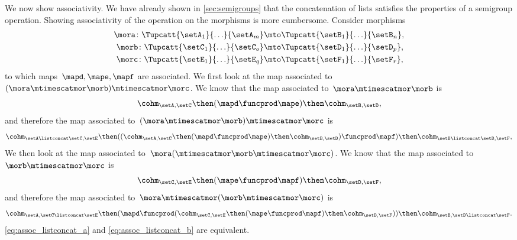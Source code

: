 {\begin{example}
        We now show associativity.
        We have already shown in \cref{sec:semigroups} that the concatenation of lists satisfies the properties of a semigroup operation.
        Showing associativity of the operation on the morphisms is more cumbersome.
        Consider morphisms
        \begin{equation*}
            \begin{aligned}
                \mora\colon \Tupcatt{\setA_1}{\ldots}{\setA_m} & \mto \Tupcatt{\setB_1}{\ldots}{\setB_n}, \\
                \morb\colon \Tupcatt{\setC_1}{\ldots}{\setC_o} & \mto \Tupcatt{\setD_1}{\ldots}{\setD_p}, \\
                \morc\colon \Tupcatt{\setE_1}{\ldots}{\setE_q} & \mto \Tupcatt{\setF_1}{\ldots}{\setF_r},
            \end{aligned}
        \end{equation*}
        to which maps~$\mapd,\mape,\mapf$ are associated.
        We first look at the map associated to~$(\mora \mtimescatmor \morb)\mtimescatmor \morc$.
        We know that the map associated to~$\mora \mtimescatmor \morb$ is
        \begin{equation*}
            \cohm_{\setA,\setC}\then (\mapd\funcprod \mape) \then \cohm_{\setB,\setD},
        \end{equation*}
        and therefore the map associated to~$(\mora \mtimescatmor \morb)\mtimescatmor \morc$ is
        \begin{equation*}
            \cohm_{\setA\listconcat\setC, \setE}\then ((\cohm_{\setA,\setC}\then (\mapd\funcprod \mape) \then \cohm_{\setB,\setD})\funcprod \mapf) \then \cohm_{\setB\listconcat \setD, \setF},
        \end{equation*}
        We then look at the map associated to~$\mora (\mtimescatmor \morb\mtimescatmor \morc)$.
        We know that the map associated to~$\morb \mtimescatmor \morc$ is
        \begin{equation}
            \label{eq:assoc_listconcat_a}
            \cohm_{\setC,\setE}\then (\mape\funcprod \mapf) \then \cohm_{\setD,\setF},
        \end{equation}
        and therefore the map associated to~$\mora \mtimescatmor (\morb\mtimescatmor \morc)$ is
        \begin{equation}
            \label{eq:assoc_listconcat_b}
            \cohm_{\setA, \setC\listconcat\setE}\then (\mapd \funcprod (\cohm_{\setC,\setE}\then (\mape\funcprod \mapf) \then \cohm_{\setD,\setF})) \then \cohm_{\setB, \setD\listconcat \setF}.
        \end{equation}
        \cref{eq:assoc_listconcat_a} and \cref{eq:assoc_listconcat_b} are equivalent.
    \end{example}
}


